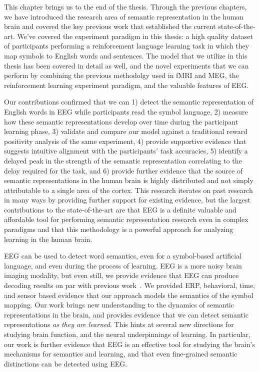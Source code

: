 \label{chapter:conclusion}

This chapter brings us to the end of the thesis. Through the previous chapters, 
we have introduced the research area of semantic representation in the human 
brain and covered the key previous work that established the current 
state-of-the-art. We've covered the experiment paradigm in this thesis: a high 
quality dataset of participants performing a reinforcement language learning 
task in which they map symbols to English words and sentences. The model that 
we utilize in this thesis has been covered in detail as well, and the novel 
experiments that we can perform by combining the previous methodolgy used in 
fMRI and MEG, the reinforcement learning experiment paradigm, and the valuable 
features of EEG.

Our contributions confirmed that we can 1) detect the semantic representation 
of English words in EEG while participants read the symbol language, 2) measure 
how these semantic representations develop over time during the participant 
learning phase, 3) validate and compare our model against a traditional reward 
positivity analysis of the same experiment, 4) provide supportive evidence that 
suggests intuitive alignment with the participants' task accuracies, 5) 
identify a delayed peak in the strength of the semantic representation 
correlating to the delay required for the task, and 6) provide further evidence 
that the source of semantic representations in the human brain is highly 
distributed and not simply attributable to a single area of the cortex. This 
research iterates on past research in many ways by providing further support 
for existing evidence, but the largest contributions to the state-of-the-art 
are that EEG is a definite valuable and affordable tool for performing semantic 
representation research even in complex paradigms and that this methodology is 
a powerful approach for analyzing learning in the human brain.

EEG can be used to detect word semantics, even for a symbol-based artificial 
language, and even during the process of learning.  EEG is a more noisy brain 
imaging modality, but even still, we provide evidence that EEG can produce 
decoding results on par with previous work~\cite{Mitchell2008}. We provided 
ERP, behavioral, time, and sensor based evidence that our approach models the 
semantics of the symbol mapping. Our work brings new understanding to the 
dynamics of semantic representations in the brain, and provides evidence that 
we can detect semantic representations \emph{as they are learned}.  This hints 
at several new directions for studying brain function, and the neural 
underpinnings of learning.  In particular, our work is further evidence that 
EEG is an effective tool for studying the brain's mechanisms for semantics and 
learning, and that even fine-grained semantic distinctions can be detected 
using EEG.
